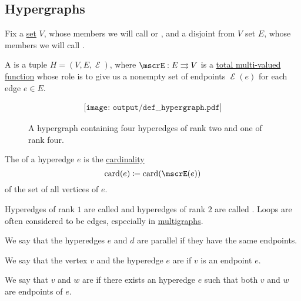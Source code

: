 \subsection{Hypergraphs}\label{subsec:hypergraphs}

\begin{definition}\label{def:hypergraph}
  Fix a \hyperref[def:set]{set} \( V \), whose members we will call  or , and a disjoint from \( V \) set \( E \), whose members we will call .

  A  is a tuple \( H = (V, E, \mscrE) \), where \( \mscrE: E \multto V \) is a \hyperref[def:multi_valued_function/total]{total multi-valued function} whose role is to give us a nonempty set of endpoints \( \mscrE(e) \) for each edge \( e \in E \).

  \begin{figure}[!ht]
    \begin{equation}\label{eq:fig:def:hypergraph}
      \begin{aligned}
        \texttt{[image: output/def\_\_hypergraph.pdf]}
      \end{aligned}
    \end{equation}
    \caption{A hypergraph containing four hyperedges of rank two and one of rank four.}\label{fig:def:hypergraph}
  \end{figure}

  \begin{thmenum}
     The  of a hyperedge \( e \) is the \hyperref[thm:cardinality_existence]{cardinality}
    \begin{equation*}
      \card(e) \coloneqq \card(\mscrE(e))
    \end{equation*}
    of the set of all vertices of \( e \).

    Hyperedges of rank \( 1 \) are called  and hyperedges of rank \( 2 \) are called . Loops are often considered to be edges, especially in \hyperref[def:undirected_multigraph]{multigraphs}.

     We say that the hyperedges \( e \) and \( d \) are parallel if they have the same endpoints.

     We say that the vertex \( v \) and the hyperedge \( e \) are  if \( v \) is an endpoint \( e \).

     We say that \( v \) and \( w \) are  if there exists an hyperedge \( e \) such that both \( v \) and \( w \) are endpoints of \( e \).


\end{thmenum}
\end{definition}
